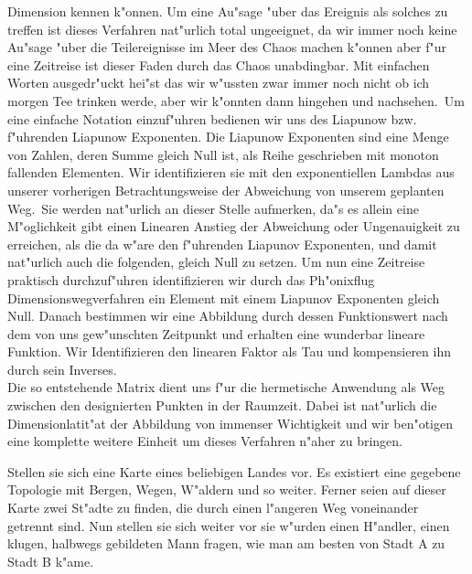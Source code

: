 \documentclass[a5paper,8pt]{book}
\begin{document}
Dimension kennen k"onnen. Um eine Au"sage "uber das Ereignis als solches zu treffen ist dieses Verfahren nat"urlich total ungeeignet, da wir immer noch keine Au"sage "uber 
die Teilereignisse im Meer des Chaos 
machen k"onnen aber f"ur eine Zeitreise ist dieser Faden durch das Chaos unabdingbar. Mit einfachen Worten ausgedr"uckt hei"st das wir w"ussten zwar immer noch nicht ob ich 
morgen Tee trinken werde, aber wir k"onnten dann hingehen und nachsehen.\
Um eine einfache Notation einzuf"uhren bedienen wir uns des Liapunow bzw. f"uhrenden Liapunow Exponenten. Die Liapunow Exponenten sind eine Menge von Zahlen, deren Summe 
gleich Null ist, als Reihe geschrieben mit monoton fallenden Elementen. Wir identifizieren sie mit den exponentiellen Lambdas aus unserer vorherigen Betrachtungsweise der 
Abweichung von unserem geplanten Weg.\
Sie werden nat"urlich an dieser Stelle aufmerken, da"s es allein eine M"oglichkeit gibt einen Linearen Anstieg der Abweichung oder Ungenauigkeit zu erreichen, als die da 
w"are den f"uhrenden Liapunov Exponenten, und damit nat"urlich auch die folgenden, gleich Null zu setzen.
Um nun eine Zeitreise praktisch durchzuf"uhren identifizieren wir durch das Ph"onixflug Dimensionswegverfahren ein Element mit einem Liapunov Exponenten gleich Null. Danach 
bestimmen wir eine Abbildung durch dessen Funktionswert nach dem von uns gew"unschten Zeitpunkt und erhalten eine wunderbar lineare Funktion. Wir Identifizieren den 
linearen Faktor als Tau und kompensieren ihn durch sein Inverses.\\

Die so entstehende Matrix dient uns f"ur die hermetische Anwendung als Weg zwischen den designierten Punkten in der Raumzeit. Dabei ist nat"urlich die Dimensionlatit"at der 
Abbildung von immenser Wichtigkeit und wir ben"otigen eine komplette weitere Einheit um dieses Verfahren n"aher zu bringen.

Stellen sie sich eine Karte eines beliebigen Landes vor. Es existiert eine gegebene Topologie mit Bergen, Wegen, W"aldern und so weiter. Ferner seien auf dieser Karte 
zwei St"adte zu finden, die durch einen l"angeren Weg voneinander getrennt sind. Nun stellen sie sich weiter vor sie w"urden einen H"andler, einen klugen, halbwegs 
gebildeten Mann fragen, wie man am besten von Stadt A zu Stadt B k"ame.
\end{document}
